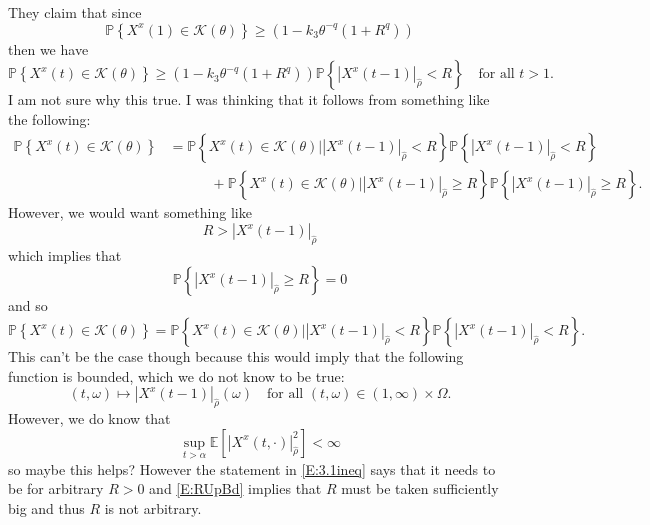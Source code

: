 \documentclass{article}
\numberwithin{equation}{section}
\begin{document}
They claim that since
	\begin{equation}\label{E:KTheta1}
			\mathbb{P}\left\{ X^x(1) \in \mathscr{K}(\theta)  \right\} \ge (1-k_3\theta^{-q}(1+R^q))
	\end{equation}
then we have
	\begin{equation}\label{E:KThetaRecursive}
		\mathbb{P}\left\{ X^x(t) \in \mathscr{K}(\theta)  \right\} \ge (1-k_3\theta^{-q}(1+R^q)) \mathbb{P}\left\{ \left| X^x(t-1) \right|_{\hat{\rho}} < R  \right\} \quad \text{for all } t>1.
	\end{equation}
I am not sure why this true. I was thinking that it follows from something like the following:
	\begin{align*}
			\mathbb{P}\left\{ X^x(t) \in \mathscr{K}(\theta)  \right\}  &= 	\mathbb{P}\left\{ X^x(t) \in \mathscr{K}(\theta) \bigg\vert  \left| X^x(t-1) \right|_{\hat{\rho}} < R  \right\} \mathbb{P}\left\{ \left| X^x(t-1) \right|_{\hat{\rho}} < R  \right\}
			\\ &\quad \quad \quad + \mathbb{P}\left\{ X^x(t) \in \mathscr{K}(\theta) \bigg \vert \left| X^x(t-1) \right|_{\hat{\rho}} \ge R  \right\} \mathbb{P}\left\{ \left| X^x(t-1) \right|_{\hat{\rho}} \ge R  \right\}.
	\end{align*}
However, we would want something like
	\begin{equation} \label{E:RUpBd}
		R > \left| X^x(t-1) \right|_{\hat{\rho}}
	\end{equation}
 which implies that
	\[
		 \mathbb{P}\left\{ \left| X^x(t-1) \right|_{\hat{\rho}} \ge R  \right\} = 0
	\]
and so
	\begin{equation}\label{E:KThetaConditional}
			\mathbb{P}\left\{ X^x(t) \in \mathscr{K}(\theta)  \right\}  = 	\mathbb{P}\left\{ X^x(t) \in \mathscr{K}(\theta) \bigg\vert  \left| X^x(t-1) \right|_{\hat{\rho}} < R  \right\} \mathbb{P}\left\{ \left| X^x(t-1) \right|_{\hat{\rho}} < R  \right\}.
	\end{equation}
This can't be the case though because this would imply that the following function is bounded, which we do not know to be true:
	\[
		(t,\omega) \mapsto \left| X^x(t-1) \right|_{\hat{\rho}}(\omega) \quad \text{for all } 	(t,\omega) \in (1,\infty) \times \Omega.
	\]
However, we do know that
	\[
		\sup_{t>\alpha} \mathbb{E}\left[ |X^x(t,\cdot)|_{\hat \rho}^2 \right] < \infty
	\]
so maybe this helps? However the statement in \eqref{E:3.1ineq} says that it needs to be for arbitrary $R>0$ and \eqref{E:RUpBd} implies that $R$ must be taken sufficiently big and thus $R$ is not arbitrary.
\end{document}
